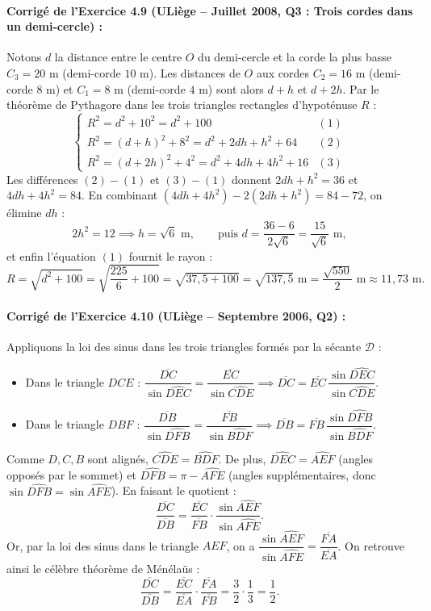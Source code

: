 \paragraph{Corrigé de l'Exercice 4.9 (ULiège -- Juillet 2008, Q3 : Trois cordes dans un demi-cercle) :}
Notons $d$ la distance entre le centre $O$ du demi-cercle et la corde la plus basse $C_3 = 20\text{ m}$ (demi-corde $10\text{ m}$). Les distances de $O$ aux cordes $C_2 = 16\text{ m}$ (demi-corde $8\text{ m}$) et $C_1 = 8\text{ m}$ (demi-corde $4\text{ m}$) sont alors $d+h$ et $d+2h$. Par le théorème de Pythagore dans les trois triangles rectangles d'hypoténuse $R$ :
\[
    \begin{cases}
        R^2 = d^2 + 10^2 = d^2 + 100 & (1) \\
        R^2 = (d+h)^2 + 8^2 = d^2 + 2dh + h^2 + 64 & (2) \\
        R^2 = (d+2h)^2 + 4^2 = d^2 + 4dh + 4h^2 + 16 & (3)
    \end{cases}
\]
Les différences $(2)-(1)$ et $(3)-(1)$ donnent $2dh + h^2 = 36$ et $4dh + 4h^2 = 84$. En combinant $(4dh+4h^2) - 2(2dh+h^2) = 84 - 72$, on élimine $dh$ :
\[
    2h^2 = 12 \implies \boxed{h = \sqrt{6}\text{ m}}, \qquad \text{puis } d = \frac{36 - 6}{2\sqrt{6}} = \frac{15}{\sqrt{6}}\text{ m},
\]
et enfin l'équation $(1)$ fournit le rayon :
\[
    R = \sqrt{d^2 + 100} = \sqrt{\frac{225}{6} + 100} = \sqrt{37,5 + 100} = \boxed{\sqrt{137,5}\text{ m} = \frac{\sqrt{550}}{2}\text{ m} \approx 11,73\text{ m}}.
\]

\paragraph{Corrigé de l'Exercice 4.10 (ULiège -- Septembre 2006, Q2) :}
Appliquons la loi des sinus dans les trois triangles formés par la sécante $\mathcal{D}$ :
\begin{itemize}
    \item Dans le triangle $DCE$ : $\dfrac{\overline{DC}}{\sin\widehat{DEC}} = \dfrac{\overline{EC}}{\sin\widehat{CDE}} \implies \overline{DC} = \overline{EC}\,\dfrac{\sin\widehat{DEC}}{\sin\widehat{CDE}}$.
    \item Dans le triangle $DBF$ : $\dfrac{\overline{DB}}{\sin\widehat{DFB}} = \dfrac{\overline{FB}}{\sin\widehat{BDF}} \implies \overline{DB} = \overline{FB}\,\dfrac{\sin\widehat{DFB}}{\sin\widehat{BDF}}$.
\end{itemize}
Comme $D, C, B$ sont alignés, $\widehat{CDE} = \widehat{BDF}$. De plus, $\widehat{DEC} = \widehat{AEF}$ (angles opposés par le sommet) et $\widehat{DFB} = \pi - \widehat{AFE}$ (angles supplémentaires, donc $\sin\widehat{DFB} = \sin\widehat{AFE}$). En faisant le quotient :
\[
    \frac{\overline{DC}}{\overline{DB}} = \frac{\overline{EC}}{\overline{FB}} \cdot \frac{\sin\widehat{AEF}}{\sin\widehat{AFE}}.
\]
Or, par la loi des sinus dans le triangle $AEF$, on a $\dfrac{\sin\widehat{AEF}}{\sin\widehat{AFE}} = \dfrac{\overline{FA}}{\overline{EA}}$. On retrouve ainsi le célèbre théorème de Ménélaüs :
\[
    \frac{\overline{DC}}{\overline{DB}} = \frac{\overline{EC}}{\overline{EA}} \cdot \frac{\overline{FA}}{\overline{FB}} = \frac{3}{2} \cdot \frac{1}{3} = \boxed{\frac{1}{2}}.
\]


